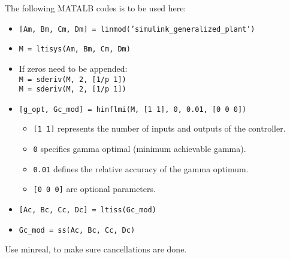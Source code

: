 The following MATALB codes is to be used here:
\begin{itemize}
    \item \texttt{[Am, Bm, Cm, Dm] = linmod('simulink\_generalized\_plant')}\\
    \item \texttt{M = ltisys(Am, Bm, Cm, Dm)}\\
  
    \item If zeros need to be appended:\\
    \texttt{M = sderiv(M, 2, [1/p 1])}\\
    \texttt{M = sderiv(M, 2, [1/p 1])}\\
    
    \item \texttt{[g\_opt, Gc\_mod] = hinflmi(M, [1\ 1], 0, 0.01, [0\ 0\ 0])}\\
    \begin{itemize}
        \item \texttt{[1\ 1]} represents the number of inputs and outputs of the controller.
        \item \texttt{0} specifies gamma optimal (minimum achievable gamma).
        \item \texttt{0.01} defines the relative accuracy of the gamma optimum.
        \item \texttt{[0\ 0\ 0]} are optional parameters.
    \end{itemize}
    
    \item \texttt{[Ac, Bc, Cc, Dc] = ltiss(Gc_mod)}\\
    \item \texttt{Gc_mod = ss(Ac, Bc, Cc, Dc)}
\end{itemize}
Use minreal, to make sure cancellations are done.

